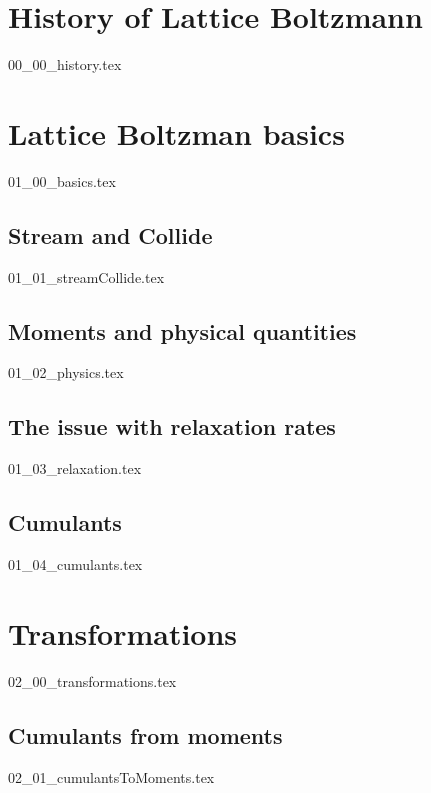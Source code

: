 \documentclass[12pt,a4paper,twoside]{article}
\begin{document}
\newpage
\tableofcontents
\newpage

\pagestyle{headings}

\section{History of Lattice Boltzmann}
\label{sec:History of Lattice Boltzmann}
{00_00_history.tex}

\section{Lattice Boltzman basics}
\label{sec:Lattice Boltzman basics}
{01_00_basics.tex}

\subsection{Stream and Collide}
\label{sub:Stream and Collide}
{01_01_streamCollide.tex}

\subsection{Moments and physical quantities}
\label{sub:Moments and physical quantities}
{01_02_physics.tex}

\subsection{The issue with relaxation rates}
\label{sub:The issue with relaxation rates}
{01_03_relaxation.tex}

\subsection{Cumulants}
\label{sub:Cumulants}
{01_04_cumulants.tex}

\section{Transformations}
\label{sec:Transformations}
{02_00_transformations.tex}

\subsection{Cumulants from moments}
\label{sub:Cumulants from moments}
{02_01_cumulantsToMoments.tex}
\end{document}
